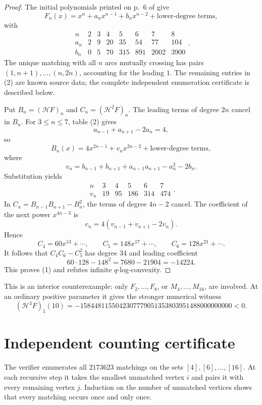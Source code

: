 \documentclass[11pt]{article}
\newcommand{\HH}{\mathcal H}
\begin{document}
\begin{proof}
The initial polynomials printed on p.~6 of \cite{Chen} give
\[
 F_n(x)=x^n+a_nx^{n-1}+b_nx^{n-2}
        +\text{lower-degree terms},
\]
with
\[
\begin{array}{c|rrrrrrr}
n&2&3&4&5&6&7&8\\\hline
a_n&2&9&20&35&54&77&104\\
b_n&0&5&70&315&891&2002&3900
\end{array}.                                                    \tag{2}
\]
The unique matching with all $n$ arcs mutually crossing has
pairs $(1,n+1),\ldots,(n,2n)$, accounting for the leading $1$.
The remaining entries in (2) are known source data; the complete
independent enumeration certificate is described below.

Put $B_n=(\HH F)_n$ and $C_n=(\HH^2F)_n$.
The leading terms of degree $2n$ cancel in $B_n$. For
$3\le n\le7$, table (2) gives
\[
 a_{n-1}+a_{n+1}-2a_n=4,
\]
so
\[
 B_n(x)=4x^{2n-1}+v_nx^{2n-2}+\text{lower-degree terms},
\]
where
\[
 v_n=b_{n-1}+b_{n+1}+a_{n-1}a_{n+1}-a_n^2-2b_n.
\]
Substitution yields
\[
\begin{array}{c|rrrrr}
n&3&4&5&6&7\\\hline
v_n&19&95&186&314&474
\end{array}.                                                    \tag{3}
\]
In $C_n=B_{n-1}B_{n+1}-B_n^2$, the terms of degree $4n-2$
cancel. The coefficient of the next power $x^{4n-3}$ is
\[
 c_n=4(v_{n-1}+v_{n+1}-2v_n).
\]
Hence
\[
 C_4=60x^{13}+\cdots,\qquad
 C_5=148x^{17}+\cdots,\qquad
 C_6=128x^{21}+\cdots.                                        \tag{4}
\]
It follows that $C_4C_6-C_5^2$ has degree $34$ and leading
coefficient
\[
 60\cdot128-148^2=7680-21904=-14224.
\]
This proves (1) and refutes infinite $q$-log-convexity.
\end{proof}

This is an interior counterexample: only $F_2,\ldots,F_8$,
or $M_4,\ldots,M_{16}$, are involved. At an ordinary positive
parameter it gives the stronger numerical witness
\[
 (\HH^3F)_5(10)=
 -1584481155042307779051353803951488000000000<0.                \tag{5}
\]

\section*{Independent counting certificate}
The verifier enumerates all $2173623$ matchings on the sets
$[4],[6],\ldots,[16]$. At each recursive step it takes the
smallest unmatched vertex $i$ and pairs it with every remaining
vertex $j$. Induction on the number of unmatched vertices shows
that every matching occurs once and only once.
\end{document}
